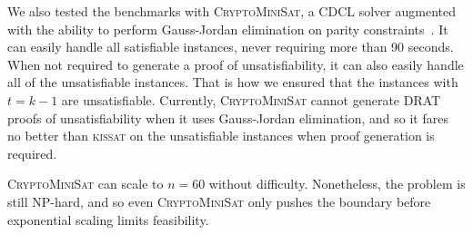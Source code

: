 \documentclass[10pt,conference]{IEEEtran}
\newcommand{\kissat}{{\sffamily\scshape kissat}}
\newcommand{\cms}{{\sffamily\scshape  CryptoMiniSat}}
\newcommand{\Cms}{{\sffamily\scshape  CryptoMiniSat}}
\begin{document}
We also tested the benchmarks with \cms{}, a CDCL solver augmented
with the ability to perform Gauss-Jordan elimination on parity
constraints~\cite{crypto}.  It can easily handle all satisfiable
instances, never requiring more than 90 seconds.  When not required to
generate a proof of unsatisfiability, it can also easily handle all of
the unsatisfiable instances.  That is how we ensured that the instances
with $t=k-1$ are unsatisfiable.
Currently, \cms{} cannot generate DRAT proofs of
unsatisfiability when it uses Gauss-Jordan elimination, 
and so it fares no better than \kissat{} on the
unsatisfiable instances when proof generation is required.

\newpage

\Cms{} can scale to $n=60$ without
difficulty.  Nonetheless, the problem is still NP-hard, and so even
\cms{} only pushes the boundary before exponential scaling limits
feasibility.  


\end{document}
